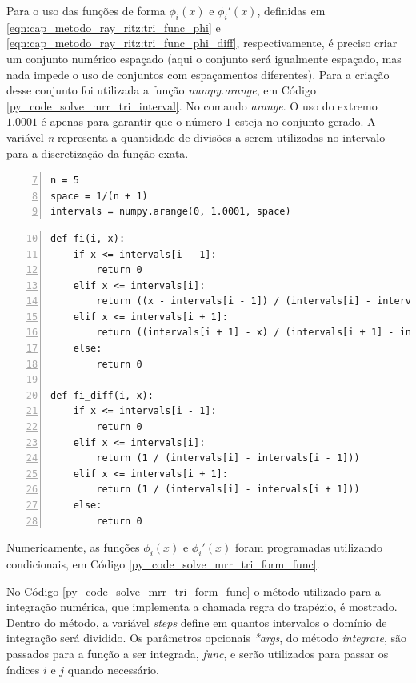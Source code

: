 \documentclass[
	12pt,				%
	openright,			%
    twoside,			%
	a4paper,			%
	english,			%
	french,				%
	spanish,			%
	brazil				%
	]{abntex2}
\numberwithin{lema}{chapter}
\numberwithin{teorema}{chapter}
\numberwithin{definicao}{chapter}
\numberwithin{exemplo}{chapter}
\numberwithin{figure}{chapter}
\begin{document}
Para o uso das funções de forma $\phi_i(x)$ e $\phi_i'(x)$, definidas em \eqref{eqn:cap_metodo_ray_ritz:tri_func_phi} e \eqref{eqn:cap_metodo_ray_ritz:tri_func_phi_diff}, respectivamente, é preciso criar um conjunto numérico espaçado (aqui o conjunto será igualmente espaçado, mas nada impede o uso de conjuntos com espaçamentos diferentes). Para a criação desse conjunto foi utilizada a função \textit{numpy.arange}, em Código \ref{py_code_solve_mrr_tri_interval}. No comando \textit{arange}. O uso do extremo $1.0001$ é apenas para garantir que o número $1$ esteja no conjunto gerado. A variável \textit{n} representa a quantidade de divisões a serem utilizadas no intervalo para a discretização da função exata.

\begin{lstlisting}[style=Python, xleftmargin=2em, numbers=left, firstnumber=7, caption={Criação dos intervalos numéricos}, captionpos=t, label=py_code_solve_mrr_tri_interval]
n = 5
space = 1/(n + 1)
intervals = numpy.arange(0, 1.0001, space)
\end{lstlisting}

\begin{lstlisting}[style=Python, xleftmargin=2em, numbers=left, firstnumber=10, caption={Função de forma $\phi$ e sua derivada}, captionpos=t, label=py_code_solve_mrr_tri_form_func]
def fi(i, x):
    if x <= intervals[i - 1]:
        return 0
    elif x <= intervals[i]:
        return ((x - intervals[i - 1]) / (intervals[i] - intervals[i - 1]))
    elif x <= intervals[i + 1]:
        return ((intervals[i + 1] - x) / (intervals[i + 1] - intervals[i]))
    else:
        return 0

def fi_diff(i, x):
    if x <= intervals[i - 1]:
        return 0
    elif x <= intervals[i]:
        return (1 / (intervals[i] - intervals[i - 1]))
    elif x <= intervals[i + 1]:
        return (1 / (intervals[i] - intervals[i + 1]))
    else:
        return 0
\end{lstlisting}

Numericamente, as funções $\phi_i(x)$ e $\phi_i'(x)$ foram programadas utilizando condicionais, em Código \ref{py_code_solve_mrr_tri_form_func}.

No Código \ref{py_code_solve_mrr_tri_form_func} o método utilizado para a integração numérica, que implementa a chamada regra do trapézio, é mostrado. Dentro do método, a variável \textit{steps} define em quantos intervalos o domínio de integração será dividido. Os parâmetros opcionais \textit{*args}, do método \textit{integrate}, são passados para a função a ser integrada, \textit{func}, e serão utilizados para passar os índices $i$ e $j$ quando necessário.
\end{document}
